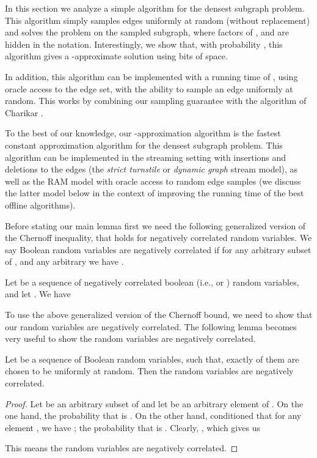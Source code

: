 In this section we analyze a simple algorithm for the densest subgraph problem. This algorithm simply samples  edges uniformly at random (without replacement) and solves the problem on the sampled subgraph, where factors of ,  and  are hidden in the  notation. 
Interestingly, we show that, with probability , this algorithm gives a -approximate solution using  bits of space.

In addition, this algorithm can be implemented with a running time of , using oracle access to the edge set, with the ability to sample an edge uniformly at random. This works by combining our sampling guarantee with the algorithm of
Charikar \cite{charikar2000greedy}. 

To the best of our knowledge, our -approximation algorithm is the fastest constant approximation algorithm for the densest subgraph problem. This algorithm can be implemented in the streaming setting with insertions and deletions to the edges (the \emph{strict turnstile} or \emph{dynamic graph} stream model), as well as the RAM model with oracle access to random edge samples (we discuss the latter model below
in the context of improving the running time of the best offline algorithms).

Before stating our main lemma first we need the following generalized version of the Chernoff inequality, that holds for negatively correlated random variables. We say Boolean random variables  are negatively correlated if for any arbitrary subset  of , and any arbitrary  we have  \cite{esfandiari2014online}.

\begin{lemma}\label{lm:chernoff}
Let  be a sequence of negatively correlated boolean (i.e.,  or ) random variables, and let . We have 

\end{lemma}

To use the above generalized version of the Chernoff bound, we need to show that our random variables are negatively correlated. The following lemma becomes very useful to show the random variables are negatively correlated.

\begin{lemma}\label{lm:negative}
Let  be a sequence of Boolean random variables, such that, exactly  of them are chosen to be  uniformly at random. Then the random variables  are negatively correlated. 
\end{lemma}
\begin{proof}
Let  be an arbitrary subset of  and let  be an arbitrary element of . On the one hand, the probability that  is . On the other hand, conditioned that for any element , we have ; the probability that  is . Clearly, , which gives us

This means the random variables  are negatively correlated. 
\end{proof}

